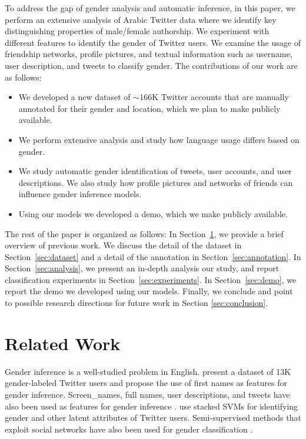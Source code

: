 \documentclass[sigconf,authorversion,nonacm]{acmart}
\begin{document}
To address the gap of gender analysis and automatic inference, in this paper, we perform an extensive analysis of Arabic Twitter data where we identify key distinguishing properties of male/female authorship. We experiment with different features to identify the gender of Twitter users. We examine the usage of friendship networks, profile pictures, and textual information such as username, user description, and tweets to classify gender. The contributions of our work are as follows:

\begin{itemize}
	\item We developed a new dataset of $\sim$166K Twitter accounts that are manually annotated for their gender and location, which we plan to make publicly available.
	\item We perform extensive analysis and study how language usage differs based on gender.
	\item We study automatic gender identification of tweets, user accounts, and user descriptions. We also study how profile pictures and networks of friends can influence gender inference models.
	\item Using our models we developed a demo, which we make publicly available. 
\end{itemize}

The rest of the paper is organized as follows: In Section~\ref{sec:related_work}, we provide a brief overview of previous work. We discuss the detail of the dataset in Section~\ref{sec:dataset} and a detail of the annotation in Section~\ref{sec:annotation}. In Section~\ref{sec:analysis}, we present an in-depth analysis our study, and report classification experiments in Section~\ref{sec:experiments}. In Section~\ref{sec:demo}, we report the demo we developed using our models. Finally, we conclude and point to possible research directions for future work in Section \ref{sec:conclusion}.

\section{Related Work}
\label{sec:related_work}

Gender inference is a well-studied problem in English. \citet{Liu2013WhatsIA} present a dataset of 13K gender-labeled Twitter users and propose the use of first names as features for gender inference. Screen\_names, full names, user descriptions, and tweets have also been used as features for gender inference \cite{burger-etal-2011-discriminating}. \citet{rao2010Classifying} use stacked SVMs for identifying gender and other latent attributes of Twitter users. Semi-supervised methods that exploit social networks have also been used for gender classification \cite{li-etal-2016-semi}.
\end{document}
